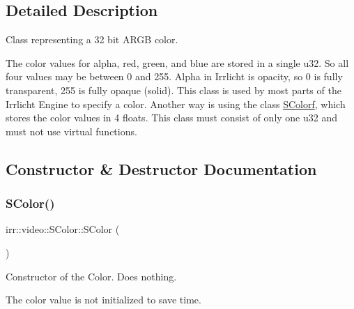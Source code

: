 \subsection{Detailed Description}
Class representing a 32 bit A\+R\+GB color. 

The color values for alpha, red, green, and blue are stored in a single u32. So all four values may be between 0 and 255. Alpha in Irrlicht is opacity, so 0 is fully transparent, 255 is fully opaque (solid). This class is used by most parts of the Irrlicht Engine to specify a color. Another way is using the class \hyperlink{classirr_1_1video_1_1SColorf}{S\+Colorf}, which stores the color values in 4 floats. This class must consist of only one u32 and must not use virtual functions. 

\subsection{Constructor \& Destructor Documentation}
\mbox{\label{classirr_1_1video_1_1SColor_ab001c0c2515ff5f8a0b324d1345485f4}} 
\subsubsection{\texorpdfstring{S\+Color()}{SColor()}\hspace{0.1cm}{\footnotesize\ttfamily [1/2]}}
{\footnotesize\ttfamily irr\+::video\+::\+S\+Color\+::\+S\+Color (\begin{DoxyParamCaption}{ }\end{DoxyParamCaption})\hspace{0.3cm}{\ttfamily [inline]}}



Constructor of the Color. Does nothing. 

The color value is not initialized to save time. \mbox{\label{classirr_1_1video_1_1SColor_aa2ca1fcb9b11375282bb407b635b3dd6}} 
